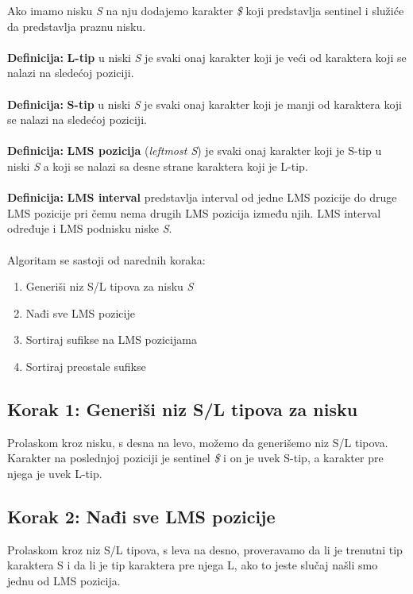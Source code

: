 \documentclass[serbian]{article}
\begin{document}
Ako imamo nisku \textit{S} na nju dodajemo karakter \textit{\$} koji predstavlja sentinel i služiće da predstavlja praznu nisku. \\\\

\textbf{Definicija:} \textbf{L-tip} u niski \textit{S} je svaki onaj karakter koji je veći od karaktera koji se nalazi na sledećoj poziciji.\\\\

\textbf{Definicija:} \textbf{S-tip} u niski \textit{S} je svaki onaj karakter koji je manji od karaktera koji se nalazi na sledećoj poziciji.\\\\

\textbf{Definicija:} \textbf{LMS pozicija} (\textit{leftmost S}) je svaki onaj karakter koji je S-tip u niski \textit{S} a koji se nalazi sa desne strane karaktera koji je L-tip.\\\\

\textbf{Definicija:} \textbf{LMS interval} predstavlja interval od jedne LMS pozicije do druge LMS pozicije pri čemu nema drugih LMS pozicija između njih. LMS interval određuje i LMS podnisku niske \textit{S}.\\\\

Algoritam se sastoji od narednih koraka:
\begin{enumerate}
    \item Generiši niz S/L tipova za nisku \textit{S}
    \item Nađi sve LMS pozicije
    \item Sortiraj sufikse na LMS pozicijama
    \item Sortiraj preostale sufikse
\end{enumerate}

\subsection{Korak 1: Generiši niz S/L tipova za nisku}
Prolaskom kroz nisku, s desna na levo, možemo da generišemo niz S/L tipova. Karakter na poslednjoj poziciji je sentinel \textit{\$} i on je uvek S-tip, a karakter pre njega je uvek L-tip.

\subsection{Korak 2: Nađi sve LMS pozicije}
Prolaskom kroz niz S/L tipova, s leva na desno, proveravamo da li je trenutni tip karaktera S i da li je tip karaktera pre njega L, ako to jeste slučaj našli smo jednu od LMS pozicija.
\end{document}
